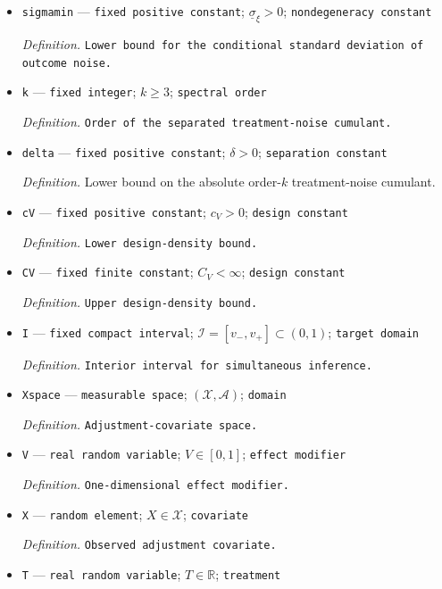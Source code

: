 \documentclass{article}
\begin{document}
\begin{itemize}
  \item \texttt{sigmamin} --- \texttt{fixed positive constant}; \(\underline\sigma_{\xi}>0\); \texttt{nondegeneracy constant}
  \par\smallskip\noindent\emph{Definition.} \texttt{Lower bound for the conditional standard deviation of outcome noise.}
  \item \texttt{k} --- \texttt{fixed integer}; \(k\ge3\); \texttt{spectral order}
  \par\smallskip\noindent\emph{Definition.} \texttt{Order of the separated treatment-\allowbreak{}noise cumulant.}
  \item \texttt{delta} --- \texttt{fixed positive constant}; \(\delta>0\); \texttt{separation constant}
  \par\smallskip\noindent\emph{Definition.} Lower bound on the absolute order-\(k\) treatment-noise cumulant.
  \item \texttt{cV} --- \texttt{fixed positive constant}; \(c_V>0\); \texttt{design constant}
  \par\smallskip\noindent\emph{Definition.} \texttt{Lower design-\allowbreak{}density bound.}
  \item \texttt{CV} --- \texttt{fixed finite constant}; \(C_V<\infty\); \texttt{design constant}
  \par\smallskip\noindent\emph{Definition.} \texttt{Upper design-\allowbreak{}density bound.}
  \item \texttt{I} --- \texttt{fixed compact interval}; \(\mathcal I=[v_-,v_+]\subset(0,1)\); \texttt{target domain}
  \par\smallskip\noindent\emph{Definition.} \texttt{Interior interval for simultaneous inference.}
  \item \texttt{Xspace} --- \texttt{measurable space}; \((\mathcal X,\mathcal A)\); \texttt{domain}
  \par\smallskip\noindent\emph{Definition.} \texttt{Adjustment-\allowbreak{}covariate space.}
  \item \texttt{V} --- \texttt{real random variable}; \(V\in[0,1]\); \texttt{effect modifier}
  \par\smallskip\noindent\emph{Definition.} \texttt{One-\allowbreak{}dimensional effect modifier.}
  \item \texttt{X} --- \texttt{random element}; \(X\in\mathcal X\); \texttt{covariate}
  \par\smallskip\noindent\emph{Definition.} \texttt{Observed adjustment covariate.}
  \item \texttt{T} --- \texttt{real random variable}; \(T\in\mathbb R\); \texttt{treatment}

\end{itemize}
\end{document}
